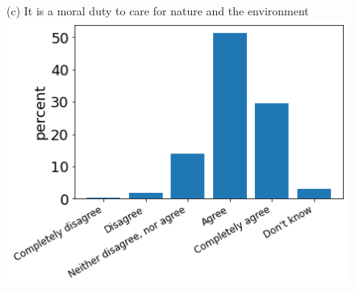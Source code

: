 \documentclass[12pt]{article}
\begin{document}
\begin{figure}[h!!]
\begin{minipage}[h!!]{0.32\textwidth}
	\end{minipage}
	\begin{minipage}[h!!]{0.32\textwidth}  
		\centering\footnotesize{(c) It is a moral duty to care for nature and the environment}
		\includegraphics[width=1\textwidth]{../codding_data/results/liss/qk20a183title0.png}
	\end{minipage}	
\end{figure}
\end{document}
